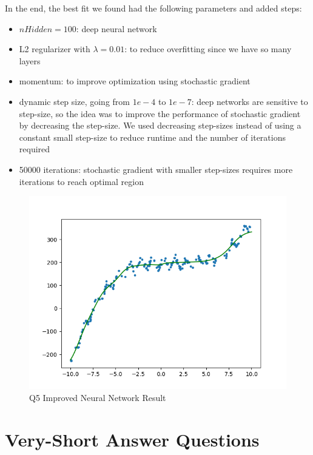 \documentclass{article}
\def\items#1{\begin{itemize}#1\end{itemize}}
\begin{document}
In the end, the best fit we found had the following parameters and added steps:
\items{
    \item $nHidden = 100$: deep neural network
    \item L2 regularizer with $\lambda = 0.01$: to reduce overfitting since we have so many layers
    \item momentum: to improve optimization using stochastic gradient
    \item dynamic step size, going from $1e-4$ to $1e-7$: deep networks are sensitive to step-size, so the idea was to improve the performance of stochastic gradient by decreasing the step-size. We used decreasing step-sizes instead of using a constant small step-size to reduce runtime and the number of iterations required
    \item 50000 iterations: stochastic gradient with smaller step-sizes requires more iterations to reach optimal region
}

\begin{figure}[h!]
    \includegraphics[width=33em]{a5_q3.png}
    \caption{Q5 Improved Neural Network Result}
    \label{fig:q3}
\end{figure}

\section{Very-Short Answer Questions}
\end{document}
